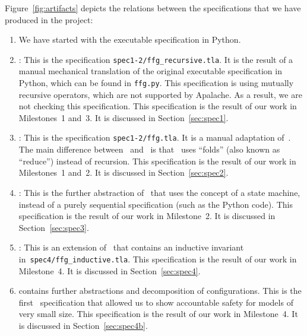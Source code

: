 Figure~\ref{fig:artifacts} depicts the relations between the specifications
that we have produced in the project:

\begin{enumerate}
    \item We have started with the executable specification in Python.

    \item \SpecOne{}: This is the specification
        \texttt{spec1-2/ffg\_recursive.tla}. It is the result of a manual
        mechanical translation of the original executable specification in
        Python, which can be found in \texttt{ffg.py}. This specification is
        using mutually recursive operators, which are not supported by
        Apalache. As a result, we are not checking this specification. This
        specification is the result of our work in Milestones~1 and~3.
        It is discussed in Section~\ref{sec:spec1}.

    \item \SpecTwo{}: This is the specification \texttt{spec1-2/ffg.tla}. It is
        a manual adaptation of~\SpecOne{}. The main difference
        between~\SpecTwo{} and~\SpecOne{} is that~\SpecTwo{} uses ``folds''
        (also known as ``reduce'') instead of recursion. This specification is
        the result of our work in Milestones~1 and~2. It is discussed in
        Section~\ref{sec:spec2}.

    \item \SpecThree{}: This is the further abstraction of~\SpecTwo{} that uses
        the concept of a state machine, instead of a purely sequential
        specification (such as the Python code). This specification is the
        result of our work in Milestone~2. It is discussed in
        Section~\ref{sec:spec3}.

    \item \SpecFour{}: This is an extension of~\SpecThree{} that contains
        an inductive invariant in~\texttt{spec4/ffg\_inductive.tla}.
        This specification is the result of our work in Milestone~4.
        It is discussed in Section~\ref{sec:spec4}.

    \item \SpecFourB{} contains further abstractions and decomposition of
        configurations. This is the first~\tlap{} specification that allowed us
        to show accountable safety for models of very small size. This
        specification is the result of our work in Milestone~4.
        It is discussed in Section~\ref{sec:spec4b}.


\end{enumerate}
